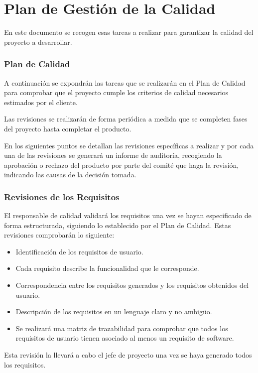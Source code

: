 \section{Plan de Gestión de la Calidad}
\par En este documento se recogen esas tareas a realizar para garantizar la calidad del proyecto a desarrollar. 

\subsubsection{Plan de Calidad}
\par A continuación se expondrán las tareas que se realizarán en el Plan de Calidad para comprobar que el proyecto cumple los criterios de calidad necesarios estimados por el cliente.

Las revisiones se realizarán de forma periódica a medida que se completen fases del proyecto hasta completar el producto.

En los siguientes puntos se detallan las revisiones específicas a realizar y por cada una de las revisiones se generará un informe de auditoría, recogiendo la aprobación o rechazo del producto por parte del comité que haga la revisión, indicando las causas de la decisión tomada.

\subsubsection{Revisiones de los Requisitos}
\par El responsable de calidad validará los requisitos una vez se hayan especificado de forma estructurada, siguiendo lo establecido por el Plan de Calidad. Estas revisiones comprobarán lo siguiente:
\begin{itemize}[-]
  \item Identificación de los requisitos de usuario.
  \item Cada requisito describe la funcionalidad que le corresponde.
  \item Correspondencia entre los requisitos generados y los requisitos obtenidos del usuario.
  \item Descripción de los requisitos en un lenguaje claro y no ambigüo.
  \item Se realizará una matriz de trazabilidad para comprobar que todos los requisitos de usuario tienen asociado al menos un requisito de software.
\end{itemize}
\par Esta revisión la llevará a cabo el jefe de proyecto una vez se haya generado todos los requisitos.

